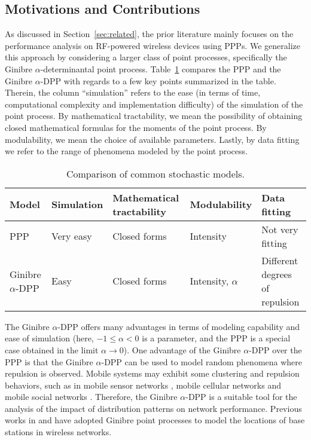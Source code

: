 \documentclass[12pt,draftclsnofoot,onecolumn]{IEEEtran}
\begin{document}
\subsection{Motivations and Contributions}

As discussed in Section~\ref{sec:related}, the prior literature mainly focuses on the performance analysis on RF-powered wireless devices using PPPs. We generalize this approach by considering a larger class of point processes, specifically the Ginibre $\alpha$-determinantal point process. 
Table~\ref{tab:comparisonpp} compares the PPP and the Ginibre $\alpha$-DPP with regards to a few key points summarized in the table. Therein, the column ``simulation'' refers to the ease (in terms of time, computational complexity and implementation difficulty) of the simulation of the point process. By mathematical tractability, we mean the possibility of obtaining closed mathematical formulas for the moments of the point process. By modulability, we mean the choice of available parameters. Lastly, by data fitting we refer to the range of phenomena modeled by the point process. 


\begin{table}
\centering
\caption{\footnotesize Comparison of common stochastic models.} \label{tab:comparisonpp}
\begin{tabular}{|l|l|l|l|l|} 
\hline
Model & Simulation & Mathematical tractability & Modulability & Data fitting\\ \hline
\hline
PPP & Very easy & Closed forms & Intensity & Not very fitting \\
\hline                                   
Ginibre $\alpha$-DPP & Easy & Closed forms & Intensity, $\alpha$ & Different degrees of repulsion\\
\hline                   
\end{tabular}
\end{table}

The Ginibre $\alpha$-DPP offers many advantages in terms of modeling capability and ease of simulation \cite{DecreusefondFlintVergne} (here, $-1\le\alpha<0$ is a parameter, and the PPP is a special case obtained in the limit $\alpha \to 0$). One advantage of the Ginibre $\alpha$-DPP over the PPP is that the Ginibre $\alpha$-DPP can be used to model random phenomena where repulsion is observed. Mobile systems may exhibit some clustering and repulsion behaviors, such as in mobile sensor networks \cite{A.A2007Abbasi}, mobile cellular networks \cite{S2013Cho} and mobile social networks \cite{N2014Vastardis}. Therefore, the Ginibre $\alpha$-DPP is a suitable tool for the analysis of the impact of distribution patterns on network performance. Previous works in \cite{N.2012Miyoshi} and \cite{N.Deng2014} have adopted Ginibre point processes to model the locations of base stations in wireless networks. 
 
\end{document}
